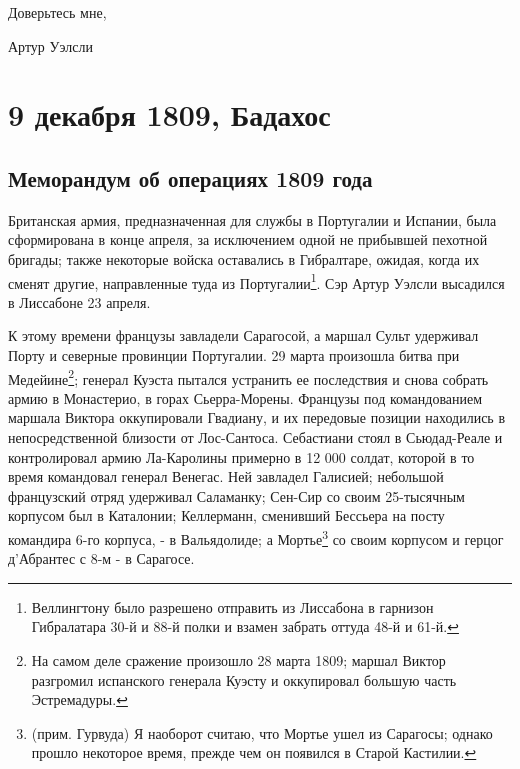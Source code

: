 \documentclass[
  oneside,
  12pt,
  titlepage]{book}
\begin{document}
Доверьтесь мне,

Артур Уэлсли

\hypertarget{part-9-ux434ux435ux43aux430ux431ux440ux44f-1809-ux431ux430ux434ux430ux445ux43eux441}{%
\part*{9 декабря 1809, Бадахос}\label{part-9-ux434ux435ux43aux430ux431ux440ux44f-1809-ux431ux430ux434ux430ux445ux43eux441}}

\hypertarget{ux43cux435ux43cux43eux440ux430ux43dux434ux443ux43c-ux43eux431-ux43eux43fux435ux440ux430ux446ux438ux44fux445-1809-ux433ux43eux434ux430}{%
\chapter{Меморандум об операциях 1809 года}\label{ux43cux435ux43cux43eux440ux430ux43dux434ux443ux43c-ux43eux431-ux43eux43fux435ux440ux430ux446ux438ux44fux445-1809-ux433ux43eux434ux430}}

Британская армия, предназначенная для службы в Португалии и Испании, была сформирована в конце апреля, за исключением одной не прибывшей пехотной бригады; также некоторые войска оставались в Гибралтаре, ожидая, когда их сменят другие, направленные туда из Португалии\footnote{Веллингтону было разрешено отправить из Лиссабона в гарнизон Гибралатара 30-й и 88-й полки и взамен забрать оттуда 48-й и 61-й.}. Сэр Артур Уэлсли высадился в Лиссабоне 23 апреля.

К этому времени французы завладели Сарагосой, а маршал Сульт удерживал Порту и северные провинции Португалии. 29 марта произошла битва при Медейине\footnote{На самом деле сражение произошло 28 марта 1809; маршал Виктор разгромил испанского генерала Куэсту и оккупировал большую часть Эстремадуры.}; генерал Куэста пытался устранить ее последствия и снова собрать армию в Монастерио, в горах Сьерра-Морены. Французы под командованием маршала Виктора оккупировали Гвадиану, и их передовые позиции находились в непосредственной близости от Лос-Сантоса. Себастиани стоял в Сьюдад-Реале и контролировал армию Ла-Каролины примерно в 12 000 солдат, которой в то время командовал генерал Венегас. Ней завладел Галисией; небольшой французский отряд удерживал Саламанку; Сен-Сир со своим 25-тысячным корпусом был в Каталонии; Келлерманн, сменивший Бессьера на посту командира 6-го корпуса, - в Вальядолиде; а Мортье\footnote{(прим. Гурвуда) Я наоборот считаю, что Мортье ушел из Сарагосы; однако прошло некоторое время, прежде чем он появился в Старой Кастилии.} со своим корпусом и герцог д'Абрантес с 8-м - в Сарагосе.
\end{document}
